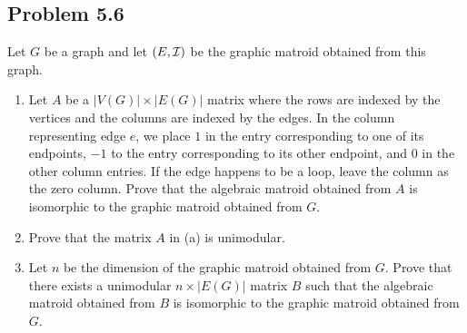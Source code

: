 \documentclass[12pt]{article}
\begin{document}
\subsection{Problem 5.6}

\begin{problem}
	Let $G$ be a graph and let $(E, \mathcal{I})$ be the graphic matroid obtained from this graph. 
    \begin{enumerate}[label = (\alph*)]
        \item Let $A$ be a $|V(G)| \times |E(G)|$ matrix where the rows are indexed by the vertices and the columns are indexed by the edges. In the column representing edge $e$, we place $1$ in the entry corresponding to one of its endpoints, $-1$ to the entry corresponding to its other endpoint, and $0$ in the other column entries. If the edge happens to be a loop, leave the column as the zero column. Prove that the algebraic matroid obtained from $A$ is isomorphic to the graphic matroid obtained from $G$. 
        \item Prove that the matrix $A$ in (a) is unimodular.
        \item Let $n$ be the dimension of the graphic matroid obtained from $G$. Prove that there exists a unimodular $n \times |E(G)|$ matrix $B$ such that the algebraic matroid obtained from $B$ is isomorphic to the graphic matroid obtained from $G$. 
    \end{enumerate}
\end{problem}
\end{document}
